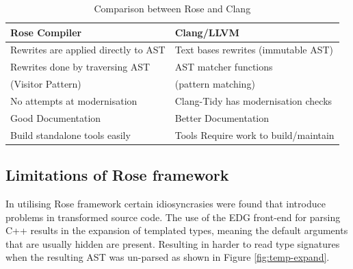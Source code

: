 \documentclass[bsc,frontabs,singlespacing,twoside,parskip,deptreport]{infthesis}
\begin{document}
\begin{table}[h]
    \begin{center}
        \begin{tabular}{| l | l |}
            \hline
             \textbf{Rose Compiler}               & \textbf{Clang/LLVM}                 \\ \hline
             Rewrites are applied directly to AST & Text bases rewrites (immutable AST) \\ \hline
             Rewrites done by traversing AST      & AST matcher functions               \\ 
             (Visitor Pattern)                    & (pattern matching)                  \\ \hline
             No attempts at modernisation         & Clang-Tidy has modernisation checks \\ \hline
             Good Documentation                   & Better Documentation                \\ \hline
             Build standalone tools easily        & Tools Require work to build/maintain\\ \hline
        \end{tabular}
        \caption{Comparison between Rose and Clang }
        \label{tab:cmp-rose-clang}
    \end{center}
\end{table}
    



\subsection{Limitations of Rose framework}
In utilising Rose framework certain idiosyncrasies were found that introduce problems in transformed source code. The use of the EDG front-end for parsing C++ results in the expansion of templated types, meaning the default arguments that are usually hidden are present. Resulting in harder to read type signatures when the resulting AST was un-parsed as shown in Figure \ref{fig:temp-expand}. 
\end{document}
